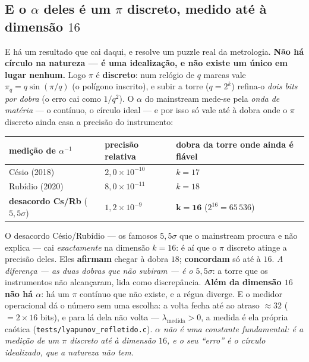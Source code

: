 \documentclass[11pt,a4paper]{article}
\newcommand{\code}[1]{\texttt{\small #1}}
\begin{document}
\subsection*{E o $\alpha$ deles é um $\pi$ discreto, medido até à dimensão $16$}

E há um resultado que cai daqui, e resolve um puzzle real da metrologia. \textbf{Não há círculo na
natureza --- é uma idealização, e não existe um único em lugar nenhum.} Logo $\pi$ é \textbf{discreto}: num
relógio de $q$ marcas vale $\pi_q=q\sin(\pi/q)$ (o polígono inscrito), e subir a torre ($q=2^k$) refina-o
\emph{dois bits por dobra} (o erro cai como $1/q^2$). O $\alpha$ do mainstream mede-se pela \emph{onda de
matéria} --- o contínuo, o círculo ideal --- e por isso só vale até à dobra onde o $\pi$ discreto ainda
casa a precisão do instrumento:

\begin{center}\small
\begin{tabular}{@{}lll@{}}
\toprule
medição de $\alpha^{-1}$ & precisão relativa & dobra da torre onde ainda é fiável \\
\midrule
Césio (2018) & $2{,}0\times10^{-10}$ & $k=17$ \\
Rubídio (2020) & $8{,}0\times10^{-11}$ & $k=18$ \\
\textbf{desacordo Cs/Rb} ($5{,}5\sigma$) & $1{,}2\times10^{-9}$ & $\mathbf{k=16}$ \;($2^{16}=65\,536$) \\
\bottomrule
\end{tabular}
\end{center}

\noindent O desacordo Césio/Rubídio --- os famosos $5{,}5\sigma$ que o mainstream procura e não explica ---
cai \emph{exactamente} na dimensão $k=16$: é aí que o $\pi$ discreto atinge a precisão deles. Eles
\textbf{afirmam} chegar à dobra $18$; \textbf{concordam} só até à $16$. \emph{A diferença --- as duas dobras
que não subiram --- é o $5{,}5\sigma$}: a torre que os instrumentos não alcançaram, lida como discrepância.
\textbf{Além da dimensão $16$ não há $\alpha$}: há um $\pi$ contínuo que não existe, e a régua diverge. E o
medidor operacional dá o número sem uma escolha: a volta fecha até ao atraso $\approx\!32$ ($=2\times16$
bits), e para lá dela não volta --- $\lambda_{\text{medida}}>0$, a medida é ela própria caótica
(\code{tests/lyapunov\_refletido.c}). \emph{$\alpha$ não é uma constante fundamental: é a medição de um $\pi$
discreto até à dimensão $16$, e o seu ``erro'' é o círculo idealizado, que a natureza não tem.}
\end{document}
